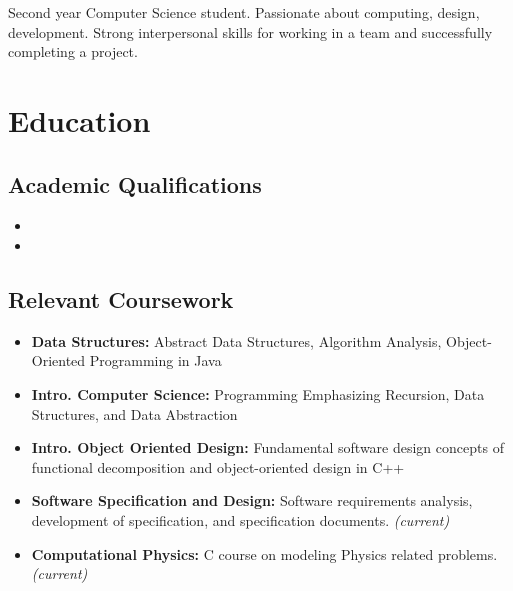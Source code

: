 \documentclass[11pt,a4paper,roman]{moderncv}        %
\begin{document}
\makecvtitle

\small{Second year Computer Science student.  Passionate about computing, design, development. Strong interpersonal skills for working in a team and successfully completing a project.}

\section{Education}

\vspace{0pt}

\subsection{Academic Qualifications}

\vspace{0pt}

\begin{itemize}

\item{}

\item{}

\end{itemize}

\vspace{2pt}

\subsection{Relevant Coursework}

\vspace{1pt}

\begin{itemize}

  \item{\textbf{Data Structures:} Abstract Data Structures, Algorithm Analysis, Object-Oriented Programming in Java}
  \item{\textbf{Intro. Computer Science:} Programming Emphasizing Recursion, Data Structures, and Data Abstraction}
  \item{\textbf{Intro. Object Oriented Design:} Fundamental software design concepts of functional decomposition and object-oriented design in C++}
  \item{\textbf{Software Specification and Design:} Software requirements analysis, development of specification, and specification documents. \textit{(current)}}
  \item{\textbf{Computational Physics:} C course on modeling Physics related problems. \textit{(current)}}

\end{itemize}
\end{document}
